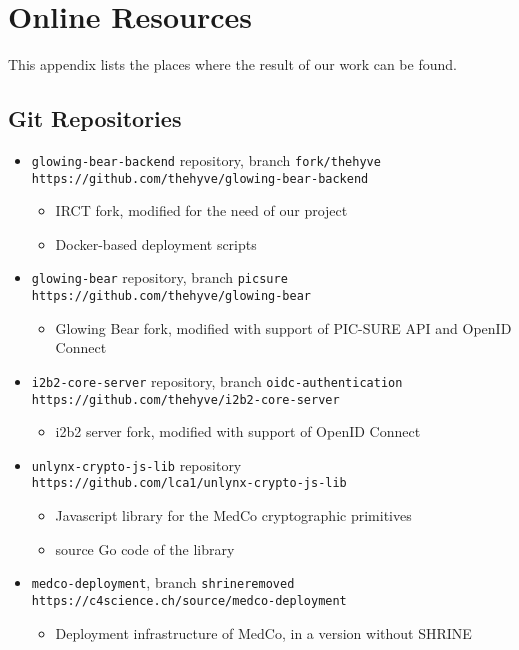 \chapter{Online Resources}

This appendix lists the places where the result of our work can be found.

\section{Git Repositories}
\begin{itemize}
    \item \verb|glowing-bear-backend| repository, branch \verb|fork/thehyve| \\
    \verb|https://github.com/thehyve/glowing-bear-backend|
    \begin{itemize}
        \item IRCT fork, modified for the need of our project
        \item Docker-based deployment scripts
    \end{itemize}
    
    \item \verb|glowing-bear| repository, branch \verb|picsure| \\
    \verb|https://github.com/thehyve/glowing-bear|
    \begin{itemize}
        \item Glowing Bear fork, modified with support of PIC-SURE API and OpenID Connect
    \end{itemize}
    
    \item \verb|i2b2-core-server| repository, branch \verb|oidc-authentication| \\
    \verb|https://github.com/thehyve/i2b2-core-server|
    \begin{itemize}
        \item i2b2 server fork, modified with support of OpenID Connect
    \end{itemize}
    
    \item \verb|unlynx-crypto-js-lib| repository \\
    \verb|https://github.com/lca1/unlynx-crypto-js-lib|
    \begin{itemize}
        \item Javascript library for the MedCo cryptographic primitives
        \item source Go code of the library
    \end{itemize}
    
    \item \verb|medco-deployment|, branch \verb|shrineremoved| \\
    \verb|https://c4science.ch/source/medco-deployment|
    \begin{itemize}
        \item Deployment infrastructure of MedCo, in a version without SHRINE
    \end{itemize}
    
\end{itemize}


